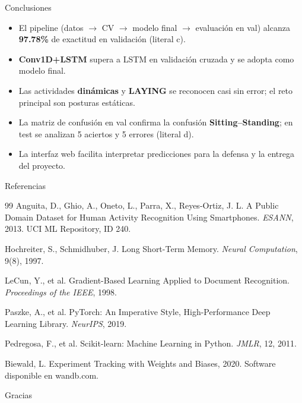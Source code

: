 \documentclass[aspectratio=169]{beamer}
\begin{document}
\begin{frame}{Conclusiones}
  \begin{itemize}
    \item El pipeline (datos $\rightarrow$ CV $\rightarrow$ modelo final $\rightarrow$ evaluación en val) alcanza \textbf{97.78\%} de exactitud en validación (literal c).
    \item \textbf{Conv1D+LSTM} supera a LSTM en validación cruzada y se adopta como modelo final.
    \item Las actividades \textbf{dinámicas} y \textbf{LAYING} se reconocen casi sin error; el reto principal son posturas estáticas.
    \item La matriz de confusión en val confirma la confusión \textbf{Sitting--Standing}; en test se analizan 5 aciertos y 5 errores (literal d).
    \item La interfaz web facilita interpretar predicciones para la defensa y la entrega del proyecto.
  \end{itemize}
\end{frame}

\begin{frame}[allowframebreaks]{Referencias}
  \large
  \begin{thebibliography}{99}
    Anguita, D., Ghio, A., Oneto, L., Parra, X., Reyes-Ortiz, J. L.
    \newblock A Public Domain Dataset for Human Activity Recognition Using Smartphones.
    \newblock \textit{ESANN}, 2013.
    \newblock UCI ML Repository, ID 240.

    Hochreiter, S., Schmidhuber, J.
    \newblock Long Short-Term Memory.
    \newblock \textit{Neural Computation}, 9(8), 1997.

    LeCun, Y., et al.
    \newblock Gradient-Based Learning Applied to Document Recognition.
    \newblock \textit{Proceedings of the IEEE}, 1998.

    Paszke, A., et al.
    \newblock PyTorch: An Imperative Style, High-Performance Deep Learning Library.
    \newblock \textit{NeurIPS}, 2019.

    Pedregosa, F., et al.
    \newblock Scikit-learn: Machine Learning in Python.
    \newblock \textit{JMLR}, 12, 2011.

    Biewald, L.
    \newblock Experiment Tracking with Weights and Biases, 2020.
    \newblock Software disponible en wandb.com.
  \end{thebibliography}
\end{frame}

\begin{frame}{}
  \centering
  \vfill
  {\Huge Gracias}
  \vfill
\end{frame}
\end{document}
